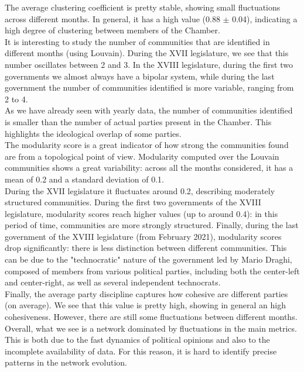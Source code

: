 The average clustering coefficient is pretty stable, showing small fluctuations across different months. In general, it has a high value (0.88 $\pm$ 0.04), indicating a high degree of clustering between members of the Chamber.\\

It is interesting to study the number of communities that are identified in different months (using Louvain). During the XVII legislature, we see that this number oscillates between 2 and 3. In the XVIII legislature, during the first two governments we almost always have a bipolar system, while during the last government the number of communities identified is more variable, ranging from 2 to 4.\\
As we have already seen with yearly data, the number of communities identified is smaller than the number of actual parties present in the Chamber. This highlights the ideological overlap of some parties.\\

The modularity score is a great indicator of how strong the communities found are from a topological point of view.
 Modularity computed over the Louvain communities shows a great variability: across all the months considered, it has a mean of 0.2 and a standard deviation of 0.1.\\
During the XVII legislature it fluctuates around 0.2, describing moderately structured communities.
 During the first two governments of the XVIII legislature, modularity scores reach higher values (up to around 0.4): in this period of time, communities are more strongly structured. Finally, during the last government of the XVIII legislature (from February 2021), modularity scores drop significantly: there is less distinction between different communities. This can be due to the "technocratic" nature of the government led by Mario Draghi, composed of members from various political parties, including both the center-left and center-right, as well as several independent technocrats. \\

Finally, the average party discipline captures how cohesive are different parties (on average). We see that this value is pretty high, showing in general an high cohesiveness. However, there are still some fluctuations between different months.\\

Overall, what we see is a network dominated by fluctuations in the main metrics. This is both due to the fast dynamics of political opinions and also to the incomplete availability of data. For this reason, it is hard to identify precise patterns in the network evolution.\\ 

